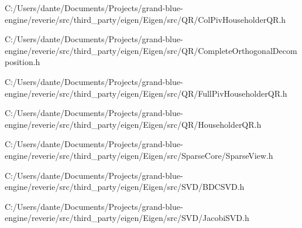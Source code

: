\begin{DoxyCompactItemize}
C\+:/\+Users/dante/\+Documents/\+Projects/grand-\/blue-\/engine/reverie/src/third\+\_\+party/eigen/\+Eigen/src/\+Q\+R/Col\+Piv\+Householder\+Q\+R.\+h\item 
C\+:/\+Users/dante/\+Documents/\+Projects/grand-\/blue-\/engine/reverie/src/third\+\_\+party/eigen/\+Eigen/src/\+Q\+R/Complete\+Orthogonal\+Decomposition.\+h\item 
C\+:/\+Users/dante/\+Documents/\+Projects/grand-\/blue-\/engine/reverie/src/third\+\_\+party/eigen/\+Eigen/src/\+Q\+R/Full\+Piv\+Householder\+Q\+R.\+h\item 
C\+:/\+Users/dante/\+Documents/\+Projects/grand-\/blue-\/engine/reverie/src/third\+\_\+party/eigen/\+Eigen/src/\+Q\+R/Householder\+Q\+R.\+h\item 
C\+:/\+Users/dante/\+Documents/\+Projects/grand-\/blue-\/engine/reverie/src/third\+\_\+party/eigen/\+Eigen/src/\+Sparse\+Core/Sparse\+View.\+h\item 
C\+:/\+Users/dante/\+Documents/\+Projects/grand-\/blue-\/engine/reverie/src/third\+\_\+party/eigen/\+Eigen/src/\+S\+V\+D/B\+D\+C\+S\+V\+D.\+h\item 
C\+:/\+Users/dante/\+Documents/\+Projects/grand-\/blue-\/engine/reverie/src/third\+\_\+party/eigen/\+Eigen/src/\+S\+V\+D/Jacobi\+S\+V\+D.\+h\end{DoxyCompactItemize}

